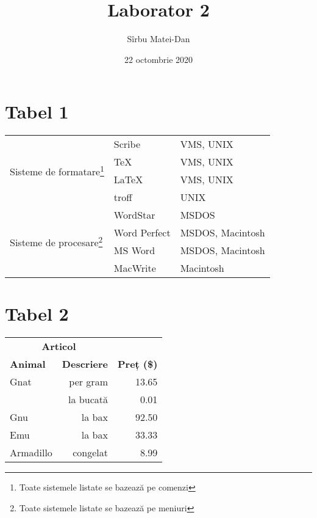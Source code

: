 \documentclass[9pt,a4paper]{article}
\title{\bf Laborator 2}
\author{Sîrbu Matei-Dan}
\date{22 octombrie 2020}
\begin{document}
\maketitle

\section*{Tabel 1}

\begin{minipage}{10cm}
    \begin{tabular}{|l|l|l|}
        \hline
        \multirow{4}{*}{Sisteme de formatare\footnote{Toate sistemele listate se bazează pe comenzi}} & Scribe       & VMS, UNIX        \\
        \cline{2-3}                                                                                   & \TeX         & VMS, UNIX        \\
        \cline{2-3}                                                                                   & \LaTeX       & VMS, UNIX        \\
        \cline{2-3}                                                                                   & troff        & UNIX             \\
        \hline
        \multirow{4}{*}{Sisteme de procesare\footnote{Toate sistemele listate se bazează pe meniuri}} & WordStar     & MSDOS            \\
        \cline{2-3}                                                                                   & Word Perfect & MSDOS, Macintosh \\
        \cline{2-3}                                                                                   & MS Word      & MSDOS, Macintosh \\
        \cline{2-3}                                                                                   & MacWrite     & Macintosh        \\
        \hline
    \end{tabular}
\end{minipage}

\section*{Tabel 2}

\begin{tabular}{lrr}
    \hline
    \multicolumn{2}{c}{\bf Articol} &                               \\
    \cline{1-2}
    \bf Animal                      & \bf Descriere & \bf Preț (\$) \\
    \hline
    Gnat                            & per gram      & 13.65         \\
                                    & la bucată     & 0.01          \\
    Gnu                             & la bax        & 92.50         \\
    Emu                             & la bax        & 33.33         \\
    Armadillo                       & congelat      & 8.99          \\
    \hline
\end{tabular}
\end{document}
